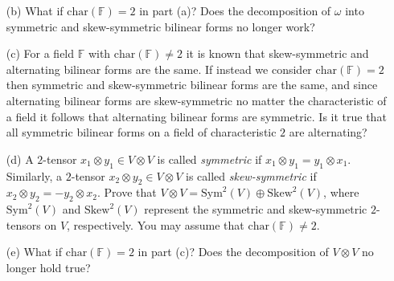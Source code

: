 \documentclass[12pt]{article}
\begin{document}
\begin{itemize}
\begin{itemize}
\begin{proof}
        Subtracting these equations we get,
        \begin{align*}
            \omega(x,y) - \omega(y,x) &= \omega_2(x,y) + \omega_2(x,y) \\
            \omega_2(x,y) &= \dfrac{\omega(x,y)-\omega(y,x)}{2}
        \end{align*}

        Adding the equations we get,
        \begin{align*}
            \omega(x,y) + \omega(y,x) &= \omega_1(x,y) + \omega_1(x,y)  \\
            \omega_1(x,y) &= \dfrac{\omega(x,y)+ \omega(y,x)}{2}
        \end{align*}

        Thus we have any bilinear form $\omega$ can be expressed as a sum of symmetric and skew-symmetric bilinear forms,
        \[\omega(x,y) = \dfrac{\omega(x,y)+ \omega(y,x)}{2} + \dfrac{\omega(x,y)-\omega(y,x)}{2}\] 
    \end{proof}
    
    \vspace{.3cm}
    \item[(b)]
    What if $\text{char}(\mathbb{F}) = 2$ in part (a)? Does the decomposition of $\omega$ into symmetric and skew-symmetric bilinear forms no longer work?
    
    \vspace{.3cm}
    \item[(c)]
    For a field $\mathbb{F}$ with $\text{char}(\mathbb{F}) \neq 2$ it is known that skew-symmetric and alternating bilinear forms are the same. If instead we consider $\text{char}(\mathbb{F}) = 2$ then symmetric and skew-symmetric bilinear forms are the same, and since alternating bilinear forms are skew-symmetric no matter the characteristic of a field it follows that alternating bilinear forms are symmetric. Is it true that all symmetric bilinear forms on a field of characteristic $2$ are alternating?
    
    \vspace{.3cm}
    \item[(d)]
    A $2$-tensor $x_1 \otimes y_1 \in V \otimes V$ is called \textit{symmetric} if $x_1 \otimes y_1 = y_1 \otimes x_1$. Similarly, a $2$-tensor $x_2 \otimes y_2 \in V \otimes V$ is called \textit{skew-symmetric} if $x_2 \otimes y_2 = -y_2 \otimes x_2$. Prove that $V \otimes V = \text{Sym}^2(V) \oplus \text{Skew}^2(V)$, where $\text{Sym}^2(V)$ and $\text{Skew}^2(V)$ represent the symmetric and skew-symmetric $2$-tensors on $V$, respectively. You may assume that $\text{char}(\mathbb{F}) \neq 2$.
    
    \vspace{.3cm}
    \item[(e)]
    What if $\text{char}(\mathbb{F}) = 2$ in part (c)? Does the decomposition of $V \otimes V$ no longer hold true?
    
    \end{itemize}
    
    \end{itemize}
\end{document}
